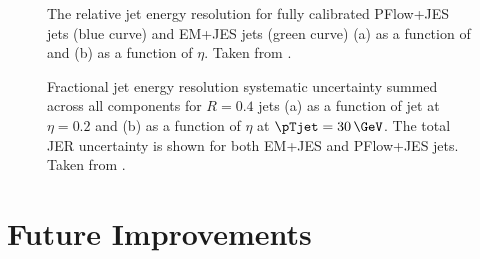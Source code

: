 \begin{figure}
    \caption{The relative jet energy resolution for fully calibrated PFlow+JES jets (blue curve) and EM+JES jets (green curve) (a) as a function of \pTjet and (b) as a function of $\eta$. Taken from .}
    \label{fig:jer-combination-results}
\end{figure}

\begin{figure}
    \caption{Fractional jet energy resolution systematic uncertainty summed across all components for \antikt $R = 0.4$ jets (a) as a function of jet \pTjet at $\eta = 0.2$ and (b) as a function of $\eta$ at $\pTjet = 30\,\GeV$. The total JER uncertainty is shown for both EM+JES and PFlow+JES jets. Taken from .}
    \label{fig:jer-combination-uncertainties}
\end{figure}



\section{Future Improvements}

